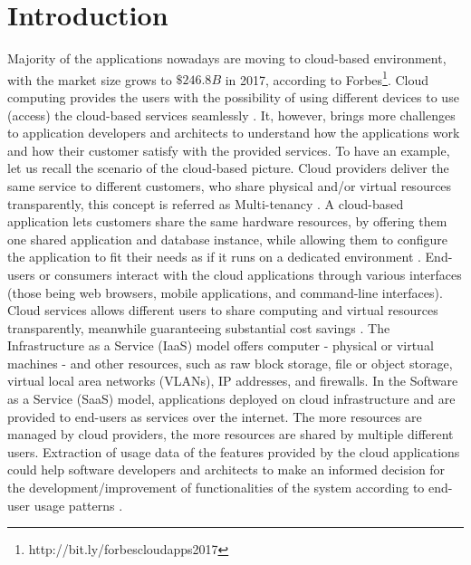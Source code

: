 \section{Introduction}\label{sec:Introduction}
%
Majority of the applications nowadays are moving to cloud-based environment, with the market size grows to $\$246.8B$ in 2017, according to Forbes\footnote{http://bit.ly/forbescloudapps2017}. Cloud computing provides the users with the possibility of using different devices to use (access) the cloud-based services seamlessly \cite{Mell2011}. It, however, brings more challenges to application developers and architects to understand how the applications work and how their customer satisfy with the provided services. To have an example, let us recall the scenario of the cloud-based picture. Cloud providers deliver the same service to different customers, who share physical and/or virtual resources transparently, this concept is referred as Multi-tenancy \cite{Kabbedijk2015}.  A cloud-based application lets customers share the same hardware resources, by offering them one shared application and database instance, while allowing them to configure the application to fit their needs as if it runs on a dedicated environment \cite{Zaidman2010}. End-users or consumers interact with the cloud applications through various interfaces (those being web browsers, mobile applications, and command-line interfaces). Cloud services allows different users to share computing and virtual resources transparently, meanwhile guaranteeing substantial cost savings \cite{Bezemer2010}. The Infrastructure as a Service (IaaS) model offers computer - physical or virtual machines - and other resources, such as raw block storage, file or object storage, virtual local area networks (VLANs), IP addresses, and firewalls. In the Software as a Service (SaaS) model, applications deployed on cloud infrastructure and are provided to end-users as services over the internet. The more resources are managed by cloud providers, the more resources are shared by multiple different users. Extraction of usage data of the features provided by the cloud applications could help software developers and architects to make an informed decision for the development/improvement of functionalities of the system according to end-user usage patterns \cite{Pachidi2014}. 

